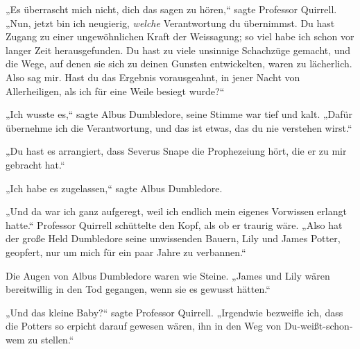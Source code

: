 „Es überrascht mich nicht, dich das sagen zu hören,“ sagte Professor Quirrell. „Nun, jetzt bin ich neugierig, \emph{welche} Verantwortung du übernimmst. Du hast Zugang zu einer ungewöhnlichen Kraft der Weissagung; so viel habe ich schon vor langer Zeit herausgefunden. Du hast zu viele unsinnige Schachzüge gemacht, und die Wege, auf denen sie sich zu deinen Gunsten entwickelten, waren zu lächerlich. Also sag mir. Hast du das Ergebnis vorausgeahnt, in jener Nacht von Allerheiligen, als ich für eine Weile besiegt wurde?“

„Ich wusste es,“ sagte Albus Dumbledore, seine Stimme war tief und kalt. „Dafür übernehme ich die Verantwortung, und das ist etwas, das du nie verstehen wirst.“

„Du hast es arrangiert, dass Severus Snape die Prophezeiung hört, die er zu mir gebracht hat.“

„Ich habe es zugelassen,“ sagte Albus Dumbledore.

„Und da war ich ganz aufgeregt, weil ich endlich mein eigenes Vorwissen erlangt hatte.“ Professor Quirrell schüttelte den Kopf, als ob er traurig wäre. „Also hat der große Held Dumbledore seine unwissenden Bauern, Lily und James Potter, geopfert, nur um mich für ein paar Jahre zu verbannen.“

Die Augen von Albus Dumbledore waren wie Steine.
„James und Lily wären bereitwillig in den Tod gegangen, wenn sie es gewusst hätten.“

„Und das kleine Baby?“ sagte Professor Quirrell. „Irgendwie bezweifle ich, dass die Potters so erpicht darauf gewesen wären, ihn in den Weg von Du-weißt-schon-wem zu stellen.“

